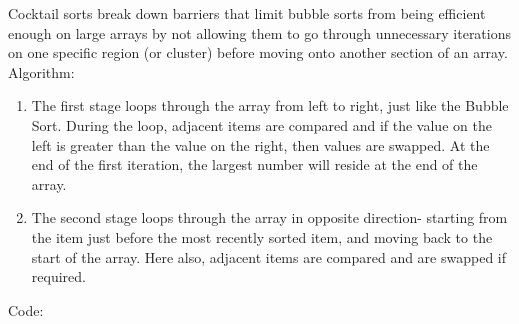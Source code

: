     Cocktail sorts break down barriers that limit bubble sorts from being efficient enough on large arrays by not allowing them to go through unnecessary iterations on one specific region (or cluster) before moving onto another section of an array.
    Algorithm: 
     \begin{enumerate} 
                \item The first stage loops through the array from left to right, just like the Bubble Sort. During the loop, adjacent items are compared and if the value on the left is greater than the value on the right, then values are swapped. At the end of the first iteration, the largest number will reside at the end of the array.
                \item The second stage loops through the array in opposite direction- starting from the item just before the most recently sorted item, and moving back to the start of the array. Here also, adjacent items are compared and are swapped if required.
            \end{enumerate}

\noindent Code:

